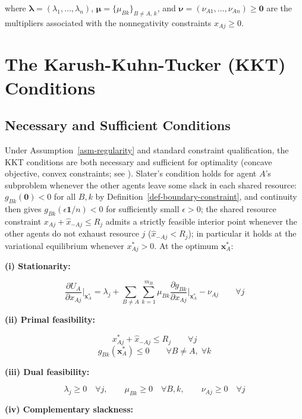 \documentclass[11pt]{article}
\theoremstyle{plain}
\theoremstyle{definition}
\theoremstyle{remark}
\let\origsection\section
\renewcommand{\section}{\needspace{12\baselineskip}\origsection}
\let\origsubsection\subsection
\renewcommand{\subsection}{\needspace{7\baselineskip}\origsubsection}
\begin{document}
where \(\boldsymbol{\lambda} = (\lambda_1, \ldots, \lambda_n)\),
\(\boldsymbol{\mu} = \{\mu_{Bk}\}_{B \neq A, \, k}\), and
\(\boldsymbol{\nu} = (\nu_{A1}, \ldots, \nu_{An}) \geq \mathbf{0}\) are
the multipliers associated with the nonnegativity constraints
\(x_{Aj} \geq 0\).

\section{The Karush-Kuhn-Tucker (KKT)
Conditions}\label{the-karush-kuhn-tucker-kkt-conditions}

\subsection{Necessary and Sufficient
Conditions}\label{necessary-and-sufficient-conditions}

Under Assumption~\ref{asm-regularity} and standard constraint
qualification, the KKT conditions are both necessary and sufficient for
optimality (concave objective, convex constraints; see
\citep[§5.5.3]{Boyd2004}). Slater's condition holds for agent \(A\)'s
subproblem whenever the other agents leave some slack in each shared
resource: \(g_{Bk}(\mathbf{0}) < 0\) for all \(B, k\) by
Definition~\ref{def-boundary-constraint}, and continuity then gives
\(g_{Bk}(\epsilon\mathbf{1}/n) < 0\) for sufficiently small
\(\epsilon > 0\); the shared resource constraint
\(x_{Aj} + \hat{x}_{-Aj} \leq R_j\) admits a strictly feasible interior
point whenever the other agents do not exhaust resource \(j\)
(\(\hat{x}_{-Aj} < R_j\)); in particular it holds at the variational
equilibrium whenever \(x_{Aj}^* > 0\). At the optimum
\(\mathbf{x}_A^*\):

\textbf{(i) Stationarity:}

\[\frac{\partial U_A}{\partial x_{Aj}}\bigg|_{\mathbf{x}_A^*} = \lambda_j + \sum_{B \neq A} \sum_{k=1}^{m_B} \mu_{Bk} \frac{\partial g_{Bk}}{\partial x_{Aj}}\bigg|_{\mathbf{x}_A^*} - \nu_{Aj} \qquad \forall j\]

\textbf{(ii) Primal feasibility:}

\[x_{Aj}^* + \hat{x}_{-Aj} \leq R_j \qquad \forall j\]
\[g_{Bk}(\mathbf{x}_A^*) \leq 0 \qquad \forall B \neq A, \; \forall k\]

\textbf{(iii) Dual feasibility:}

\[\lambda_j \geq 0 \quad \forall j, \qquad \mu_{Bk} \geq 0 \quad \forall B, k, \qquad \nu_{Aj} \geq 0 \quad \forall j\]

\textbf{(iv) Complementary slackness:}
\end{document}
